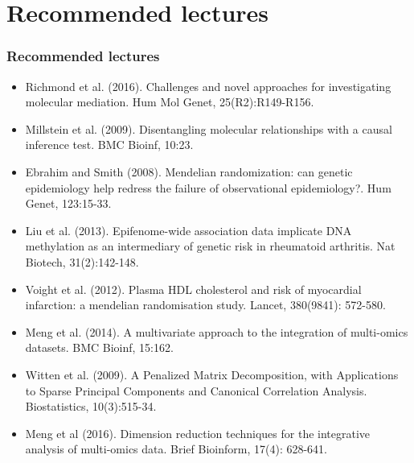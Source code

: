 \documentclass[10pt,xcolor=dvipsnames]{beamer}\usepackage[]{graphicx}\usepackage[]{color}
\begin{document}
\section{Recommended lectures}

\begin{frame}\frametitle{Recommended lectures}

\footnotesize

\begin{itemize}
\item Richmond et al. (2016). Challenges and novel approaches for investigating molecular mediation. Hum Mol Genet, 25(R2):R149-R156.
\item Millstein et al. (2009). Disentangling molecular relationships with a causal inference test. BMC Bioinf, 10:23.
\item Ebrahim and Smith (2008). Mendelian randomization: can genetic epidemiology help redress the failure of observational epidemiology?. Hum Genet, 123:15-33.
\item Liu et al. (2013). Epifenome-wide association data implicate DNA methylation as an intermediary of genetic risk in rheumatoid arthritis. Nat Biotech, 31(2):142-148.
\item Voight et al. (2012). Plasma HDL cholesterol and risk of myocardial infarction: a mendelian randomisation study. Lancet, 380(9841): 572-580.
\item Meng et al. (2014). A multivariate approach to the integration of multi-omics datasets. BMC Bioinf, 15:162.
\item Witten et al. (2009). A Penalized Matrix Decomposition, with Applications to Sparse Principal Components and Canonical Correlation Analysis. Biostatistics, 10(3):515-34.
\item Meng et al (2016). Dimension reduction techniques for the integrative analysis of multi-omics data. Brief Bioinform, 17(4): 628-641. 
\end{itemize}
\end{frame}
\end{document}
